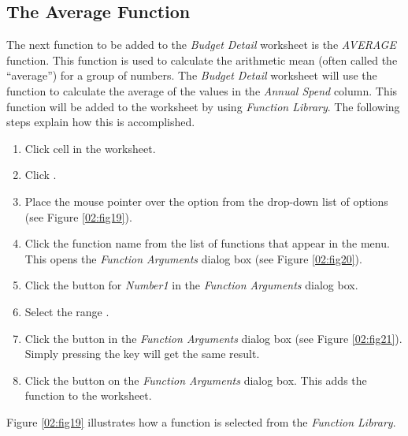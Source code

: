 \subsection{The Average Function}

The next function to be added to the \textit{Budget Detail} worksheet is the \textit{AVERAGE} function. This function is used to calculate the arithmetic mean (often called the ``average'') for a group of numbers. The \textit{Budget Detail} worksheet will use the function to calculate the average of the values in the \textit{Annual Spend} column. This function will be added to the worksheet by using \textit{Function Library}. The following steps explain how this is accomplished.

\begin{enumbox}
	\begin{enumerate}
		\item Click cell  in the  worksheet.
		\item Click .
		\item Place the mouse pointer over the  option from the drop-down list of options (see Figure \ref{02:fig19}).
		\item Click the  function name from the list of functions that appear in the menu. This opens the \textit{Function Arguments} dialog box (see Figure \ref{02:fig20}).
		\item Click the  button for \textit{Number1} in the \textit{Function Arguments} dialog box.
		\item Select the range .
		\item Click the  button in the \textit{Function Arguments} dialog box (see Figure \ref{02:fig21}). Simply pressing the  key will get the same result.
		\item Click the  button on the \textit{Function Arguments} dialog box. This adds the  function to the worksheet.
	\end{enumerate}
\end{enumbox}

Figure \ref{02:fig19} illustrates how a function is selected from the  \textit{Function Library}.

